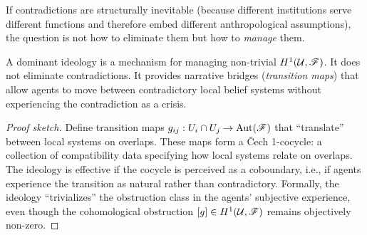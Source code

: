 If contradictions are structurally inevitable (because different institutions serve different functions and therefore embed different anthropological assumptions), the question is not how to eliminate them but how to \emph{manage} them.

\begin{theorem}
\label{thm:ideology-obstruction}
A dominant ideology is a mechanism for managing non-trivial $H^1(\mathcal{U}, \mathscr{F})$.
It does not eliminate contradictions.
It provides narrative bridges (\emph{transition maps}) that allow agents to move between contradictory local belief systems without experiencing the contradiction as a crisis.
\end{theorem}

\begin{proof}[Proof sketch]
Define transition maps $g_{ij}: U_i \cap U_j \to \mathrm{Aut}(\mathscr{F})$ that ``translate'' between local systems on overlaps.
These maps form a \v{C}ech 1-cocycle: a collection of compatibility data specifying how local systems relate on overlaps.
The ideology is effective if the cocycle is perceived as a coboundary, i.e., if agents experience the transition as natural rather than contradictory.
Formally, the ideology ``trivializes'' the obstruction class in the agents' subjective experience, even though the cohomological obstruction $[g] \in H^1(\mathcal{U}, \mathscr{F})$ remains objectively non-zero.
\end{proof}

